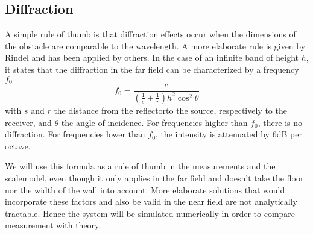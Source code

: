 \subsection{Diffraction}

A simple rule of thumb is that diffraction effects occur when the dimensions of the obstacle are comparable to the wavelength. A more elaborate rule is given by Rindel\cite{rindel-diffraction} and has been applied by others\cite{dave-diffraction, stage-acoustics}. In the case of an infinite band of height $h$, it states that the diffraction in the far field can be characterized by a frequency $f_0$
\begin{equation}
\label{diffractionEq}
f_0 = \frac{c}{
	\left(\frac{1}{s} + \frac{1}{r}\right) h^2 \cos^2 \theta}
\end{equation}
with $s$ and $r$ the distance from the reflectorto the source, respectively to the receiver, and $\theta$ the angle of incidence. For frequencies higher than $f_0$, there is no diffraction. For frequencies lower than $f_0$, the intensity is attenuated by 6dB per octave. 

We will use this formula as a rule of thumb in the measurements and the scalemodel, even though it only applies in the far field and doesn't take the floor nor the width of the wall into account. More elaborate solutions that would incorporate these factors and also be valid in the near field are not analytically tractable. Hence the system will be simulated numerically in order to compare measurement with theory.


